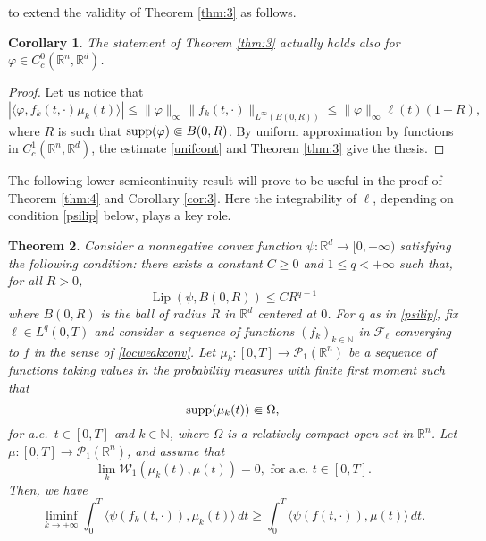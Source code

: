 \documentclass[11pt]{article}
\theoremstyle{plain}
\newtheorem{theorem}{Theorem}[section]
\newtheorem{corollary}[theorem]{Corollary}
\theoremstyle{definition}
\theoremstyle{remark}
\numberwithin{equation}{section}
\newcommand{\supp}{{\rm supp}}
\newcommand{\R}{{\mathbb R}}
\newcommand{\N}{\mathbb N}
\begin{document}
to extend the validity of Theorem \ref{thm:3} as follows.
\begin{corollary}\label{cor:2}
The statement of Theorem \ref{thm:3} actually holds also for $\varphi \in C_c^0(\mathbb R^n,\mathbb R^d)$.
\end{corollary}
\begin{proof}
Let us notice that 
\begin{equation}\label{unifcont}
|\langle \varphi, f_k(t,\cdot) \mu_k(t) \rangle| \leq \|\varphi\|_\infty \| f_k(t,\cdot) \|_{L^\infty(B(0,R))} \leq  \|\varphi\|_\infty \ell(t) (1+R),
\end{equation}
where $R$ is such that $\supp(\varphi) \Subset B(0,R)$. By uniform approximation by functions in $C_c^1(\mathbb R^n,\mathbb R^d)$, 
the estimate \eqref{unifcont} and Theorem \ref{thm:3} give the thesis.
\end{proof}

The following lower-semicontinuity result will prove to be useful in the proof of Theorem \ref{thm:4} and Corollary \ref{cor:3}. Here the integrability of $\ell$, depending on condition \eqref{psilip} below, plays a key role.

\begin{theorem}\label{thm:4+}
Consider a nonnegative convex function $\psi \colon \R^d\to[0,+\infty)$ satisfying the following condition: there exists a constant $C\ge 0$ and $1\le q <+\infty$ such that, for all $R>0$,
\begin{equation}\label{psilip}
\operatorname{Lip}(\psi, B(0, R))\le C R^{q-1}
\end{equation}
where $B(0,R)$ is the ball of radius $R$ in $\R^d$ centered at $0$. For $q$ as in \eqref{psilip}, fix $\ell \in L^q(0,T)$ and consider a sequence of functions $(f_k)_{k \in \mathbb N}$ in $\mathcal F_\ell$ converging to $f$ in the sense of \eqref{locweakconv}. Let $\mu_k:[0,T] \to \mathcal P_1(\mathbb R^{n})$ be a sequence of functions taking values
in the probability measures with finite first moment such that
\begin{equation}\label{bound}
\supp (\mu_k(t)) \Subset  \Omega,
\end{equation}
for a.e.\ $t \in [0,T]$ and $k \in \N$, where $\Omega$ is a relatively compact open set in $\mathbb R^n$. Let $\mu :[0,T] \to \mathcal P_1(\mathbb R^n)$, and assume that 
\begin{equation}\label{convwass2}
\lim_k \mathcal W_1(\mu_k(t),\mu(t)) = 0, \mbox{ for a.e.\ } t \in [0,T].
\end{equation} 
Then, we have
\begin{equation}\label{semicont+}
\liminf_{k\to +\infty}\int_0^T \langle \psi(f_k(t,\cdot)), \mu_k(t) \rangle\,dt \ge \int_0^T \langle \psi(f(t,\cdot)), \mu(t) \rangle\,dt. 
\end{equation}
\end{theorem}
\end{document}
